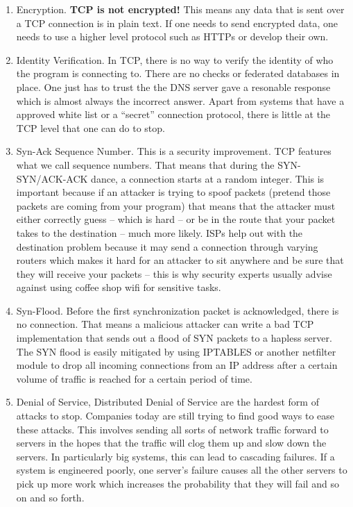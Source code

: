 \begin{enumerate}
\item Encryption.
  \textbf{TCP is not encrypted!} This means any data that is sent over a TCP connection is in plain text.
  If one needs to send encrypted data, one needs to use a higher level protocol such as HTTPs or develop their own.
\item Identity Verification.
  In TCP, there is no way to verify the identity of who the program is connecting to.
  There are no checks or federated databases in place.
  One just has to trust the the DNS server gave a resonable response which is almost always the incorrect answer.
  Apart from systems that have a approved white list or a ``secret'' connection protocol, there is little at the TCP level that one can do to stop.
\item Syn-Ack Sequence Number.
  This is a security improvement.
  TCP features what we call sequence numbers.
  That means that during the SYN-SYN/ACK-ACK dance, a connection starts at a random integer.
  This is important because if an attacker is trying to spoof packets (pretend those packets are coming from your program) that means that the attacker must either correctly guess -- which is hard -- or be in the route that your packet takes to the destination -- much more likely.
  ISPs help out with the destination problem because it may send a connection through varying routers which makes it hard for an attacker to sit anywhere and be sure that they will receive your packets -- this is why security experts usually advise against using coffee shop wifi for sensitive tasks.
\item Syn-Flood.
  Before the first synchronization packet is acknowledged, there is no connection.
  That means a malicious attacker can write a bad TCP implementation that sends out a flood of SYN packets to a hapless server.
  The SYN flood is easily mitigated by using IPTABLES or another netfilter module to drop all incoming connections from an IP address after a certain volume of traffic is reached for a certain period of time.
\item Denial of Service, Distributed Denial of Service are the hardest form of attacks to stop.
  Companies today are still trying to find good ways to ease these attacks.
  This involves sending all sorts of network traffic forward to servers in the hopes that the traffic will clog them up and slow down the servers.
  In particularly big systems, this can lead to cascading failures. If a system is engineered poorly, one server's failure causes all the other servers to pick up more work which increases the probability that they will fail and so on and so forth.
\end{enumerate}

